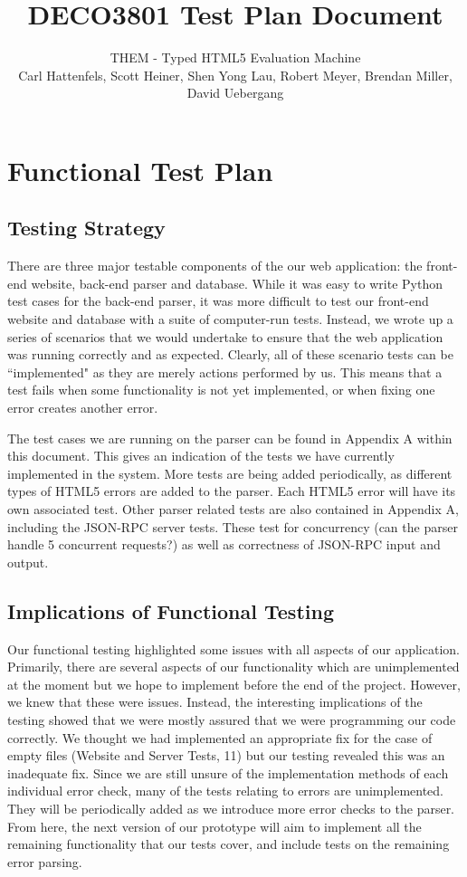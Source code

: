 \documentclass[10pt]{article}
\title{\bf DECO3801 Test Plan Document}
\author{\normalsize THEM - Typed HTML5 Evaluation Machine \\ \normalsize Carl Hattenfels, Scott Heiner, Shen Yong Lau, Robert Meyer, Brendan Miller, David Uebergang}
\date{}
\begin{document}
\maketitle

\section*{Functional Test Plan}

\subsection*{Testing Strategy}

There are three major testable components of the our web application: the front-end website, back-end parser and database. While it was easy to write Python test cases for the back-end parser, it was more difficult to test our front-end website and database with a suite of computer-run tests. Instead, we wrote up a series of scenarios that we would undertake to ensure that the web application was running correctly and as expected. Clearly, all of these scenario tests can be ``implemented" as they are merely actions performed by us. This means that a test fails when some functionality is not yet implemented, or when fixing one error creates another error.

The test cases we are running on the parser can be found in Appendix A within this document. This gives an indication of the tests we have currently implemented in the system. More tests are being added periodically, as different types of HTML5 errors are added to the parser. Each HTML5 error will have its own associated test. Other parser related tests are also contained in Appendix A, including the JSON-RPC server tests. These test for concurrency (can the parser handle 5 concurrent requests?) as well as correctness of JSON-RPC input and output.

\subsection*{Implications of Functional Testing}

Our functional testing highlighted some issues with all aspects of our application. Primarily, there are several aspects of our functionality which are unimplemented at the moment but we hope to implement before the end of the project. However, we knew that these were issues. Instead, the interesting implications of the testing showed that we were mostly assured that we were programming our code correctly. We thought we had implemented an appropriate fix for the case of empty files (Website and Server Tests, 11) but our testing revealed this was an inadequate fix. Since we are still unsure of the implementation methods of each individual error check, many of the tests relating to errors are unimplemented. They will be periodically added as we introduce more error checks to the parser. From here, the next version of our prototype will aim to implement all the remaining functionality that our tests cover, and include tests on the remaining error parsing.
\end{document}
